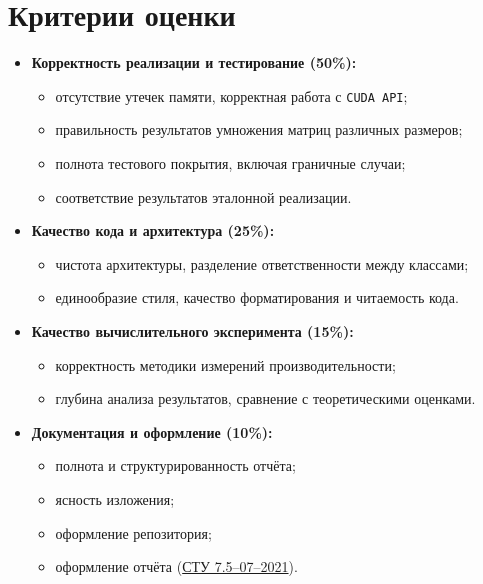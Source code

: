 \documentclass[12pt]{article}
\begin{document}
\section*{Критерии оценки}
\begin{itemize}
    \item \textbf{Корректность реализации и тестирование (50\%):}
    \begin{itemize}
        \item отсутствие утечек памяти, корректная работа с \texttt{CUDA API};
        \item правильность результатов умножения матриц различных размеров;
        \item полнота тестового покрытия, включая граничные случаи;
        \item соответствие результатов эталонной реализации.
    \end{itemize}

    \item \textbf{Качество кода и архитектура (25\%):}
    \begin{itemize}
        \item чистота архитектуры, разделение ответственности между классами;
        \item единообразие стиля, качество форматирования и читаемость кода.
    \end{itemize}

    \item \textbf{Качество вычислительного эксперимента (15\%):}
    \begin{itemize}
        \item корректность методики измерений производительности;
        \item глубина анализа результатов, сравнение с теоретическими оценками.
    \end{itemize}

    \item \textbf{Документация и оформление (10\%):}
    \begin{itemize}
        \item полнота и структурированность отчёта;
        \item ясность изложения;
        \item оформление репозитория;
        \item оформление отчёта (\href{https://sfu.ru/sapi/file-upload/325396c75b669b84763c10b7b5c73ec1.pdf}{СТУ 7.5–07–2021}).
    \end{itemize}
\end{itemize}
\end{document}

